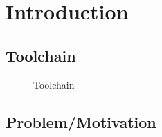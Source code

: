 \section{Introduction}

\subsection{Toolchain}

\begin{figure}[h]
  \centering
  
  \caption{Toolchain}
\end{figure}

\subsection{Problem/Motivation}


